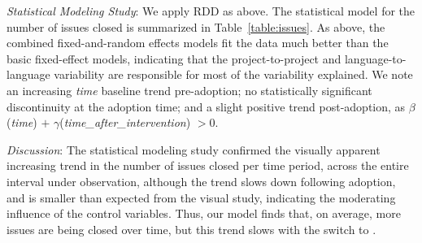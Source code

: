 %

\smallskip\noindent \emph{Statistical Modeling Study}:
We apply RDD as above. 
The statistical model for the number of issues closed is summarized in Table~\ref{table:issues}.
As above, the combined fixed-and-random effects models fit the data much 
better than the basic fixed-effect models, indicating that the project-to-project 
and language-to-language variability are responsible for most of the variability 
explained.
We note an increasing
\emph{time} baseline trend pre-adoption; no statistically significant discontinuity
at the adoption time; and a slight positive trend post-adoption, as $\beta$(\emph{time}) $+$ 
$\gamma$(\emph{time\_after\_intervention}) $> 0$.




\smallskip\noindent \emph{Discussion}:
%
The statistical modeling study confirmed the visually apparent increasing trend in the number of issues 
closed per time period, across the entire interval under observation, although the trend slows down following \Tvis adoption, and is smaller than expected from the visual study, indicating the moderating influence of the control variables.
Thus, our model finds that, on average, more issues are being closed 
over time, but this trend slows with the switch to \Tvis.

